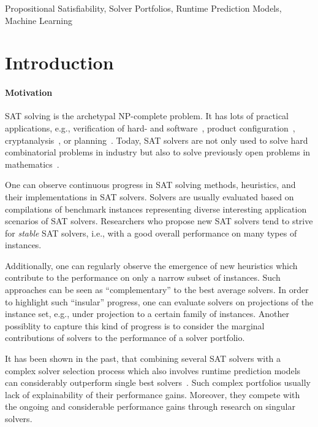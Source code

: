 \documentclass[conference]{IEEEtran}
\begin{document}
\begin{IEEEkeywords}
Propositional Satisfiability, Solver Portfolios, Runtime Prediction Models, Machine Learning
\end{IEEEkeywords}

\section{Introduction}
\label{sec:introduction}

\paragraph{Motivation}

SAT solving is the archetypal NP-complete problem. It has lots of practical applications, e.g., verification of hard- and software~\cite{Kaufmann:2021:Amulet,Buning:2020:QPRVerify}, product configuration~\cite{Janota:2014:Configuration}, cryptanalysis~\cite{Nejati:2020:CDCLCrypto}, or planning~\cite{Schreiber:2021:Lilotane}. 
Today, SAT solvers are not only used to solve hard combinatorial problems in industry but also to solve previously open problems in mathematics~\cite{Heule:2016:Pyth,Heule:2018:Schur}. 

One can observe continuous progress in SAT solving methods, heuristics, and their implementations in SAT solvers. 
Solvers are usually evaluated based on compilations of benchmark instances representing diverse interesting application scenarios of SAT solvers. 
Researchers who propose new SAT solvers tend to strive for \emph{stable} SAT solvers, i.e., with a good overall performance on many types of instances. 

Additionally, one can regularly observe the emergence of new heuristics which contribute to the performance on only a narrow subset of instances. 
Such approaches can be seen as ``complementary'' to the best average solvers. 
In order to highlight such ``insular'' progress, one can evaluate solvers on projections of the instance set, e.g., under projection to a certain family of instances. 
Another possiblity to capture this kind of progress is to consider the marginal contributions of solvers to the performance of a solver portfolio. 

It has been shown in the past, that combining several SAT solvers with a complex solver selection process which also involves runtime prediction models can considerably outperform single best solvers~\cite{xu2008satzilla}. 
Such complex portfolios usually lack of explainability of their performance gains. 
Moreover, they compete with the ongoing and considerable performance gains through research on singular solvers. 
\end{document}
